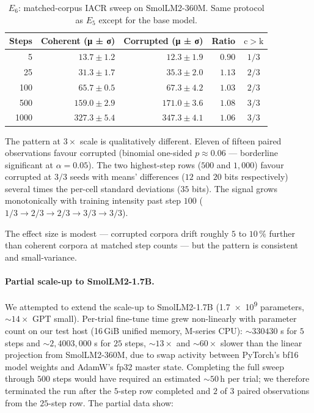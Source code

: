 \documentclass[11pt,a4paper]{article}
\begin{document}
\begin{table}[h]
  \centering
  \caption{$E_6$: matched\nobreakdash-corpus IACR sweep on
    SmolLM2\nobreakdash-360M.  Same protocol as $E_5$ except for the
    base model.}
  \label{tab:poisoning:scale}
  \begin{tabular}{r r r r c}
    \toprule
    \textbf{Steps} & \textbf{Coherent (μ ± σ)} & \textbf{Corrupted (μ ± σ)} & \textbf{Ratio} & \textbf{$\mathrm{c}>\mathrm{k}$} \\
    \midrule
       5 &  $13.7 \pm 1.2$ &  $12.3 \pm 1.9$ & $0.90$ & $1/3$ \\
      25 &  $31.3 \pm 1.7$ &  $35.3 \pm 2.0$ & $1.13$ & $2/3$ \\
     100 &  $65.7 \pm 0.5$ &  $67.3 \pm 4.2$ & $1.03$ & $2/3$ \\
     500 & $159.0 \pm 2.9$ & $171.0 \pm 3.6$ & $1.08$ & $3/3$ \\
    1000 & $327.3 \pm 5.4$ & $347.3 \pm 4.1$ & $1.06$ & $3/3$ \\
    \bottomrule
  \end{tabular}
\end{table}

The pattern at $3\!\times$ scale is qualitatively different.
Eleven of fifteen paired observations favour corrupted (binomial
one\nobreakdash-sided $p \approx 0.06$ — borderline significant at
$\alpha = 0.05$).  The two highest\nobreakdash-step rows ($500$
and $1{,}000$) favour corrupted at $3/3$ seeds with means'
differences ($12$ and $20$ bits respectively) several times the
per\nobreakdash-cell standard deviations ($3$\textendash$5$ bits).
The signal grows monotonically with training intensity past step
$100$ ($1/3 \to 2/3 \to 2/3 \to 3/3 \to 3/3$).

The effect size is modest — corrupted corpora drift roughly $5$
to $10\,\%$ further than coherent corpora at matched step counts
— but the pattern is consistent and small\nobreakdash-variance.

\paragraph{Partial scale-up to SmolLM2-1.7B.}
We attempted to extend the scale\nobreakdash-up to
SmolLM2\nobreakdash-1.7B (\num{1.7e9} parameters,
$\sim\!14\!\times$ GPT small).  Per\nobreakdash-trial
fine\nobreakdash-tune time grew non\nobreakdash-linearly with
parameter count on our test host (16\,GiB unified memory,
M\nobreakdash-series CPU): $\sim\!330$\textendash$430$ s for
$5$ steps and $\sim\!2{,}400$\textendash$3{,}000$ s for $25$ steps,
$\sim\!13\!\times$ and $\sim\!60\!\times$ slower than the linear
projection from SmolLM2\nobreakdash-360M, due to swap activity
between PyTorch's bf16 model weights and AdamW's fp32 master
state.  Completing the full sweep through $500$ steps would have
required an estimated $\sim\!50$\,h per trial; we therefore
terminated the run after the $5$\nobreakdash-step row completed and
$2$ of $3$ paired observations from the $25$\nobreakdash-step row.
The partial data show:
\end{document}
